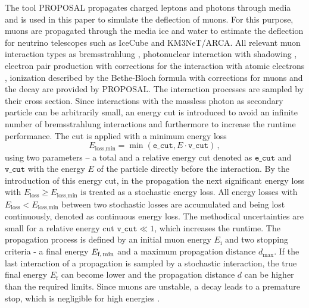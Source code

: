 \documentclass[pdflatex, sn-mathphys]{sn-jnl}%
\theoremstyle{thmstyleone}%
\theoremstyle{thmstyletwo}%
\theoremstyle{thmstylethree}%
\begin{document}
The tool PROPOSAL \cite{koehne2013proposal, dunsch_2018_proposal_improvements} propagates charged leptons and photons through media and is 
used in this paper to simulate the deflection of muons. For this purpose, 
muons are propagated through the media ice and water 
to estimate the deflection for neutrino telescopes such as IceCube and KM3NeT/ARCA. All relevant muon interaction types 
as bremsstrahlung \cite{KKP_1995, Bremsstrahlung_KKP}, photonuclear interaction \cite{Abramowicz_1997} with 
shadowing \cite{ButkevichMikheyev_2002}, electron pair production \cite{epair_kokoulin_petrukhin} with corrections for the 
interaction with atomic electrons \cite{epair_kelner}, 
ionization described by the Bethe-Bloch formula with corrections for muons \cite{Rossi} 
and the decay are provided by PROPOSAL. The interaction processes are sampled by their cross section.
Since interactions 
with the massless photon as secondary particle can be arbitrarily small, an energy cut is introduced to avoid an infinite number of bremsstrahlung interactions 
and furthermore to increase the runtime performance. 
The cut is applied with a minimum energy loss
\begin{equation}
    E_{\text{loss,min}} = \min{(\texttt{e\_cut}, E \cdot \texttt{v\_cut})}\,,
\end{equation}
using two parameters -- a total and a relative energy cut denoted as 
$\texttt{e\_cut}$ and $\texttt{v\_cut}$ with the energy $E$ of the particle 
directly before the interaction. 
By the introduction of 
this energy cut, in the propagation the next significant energy loss with 
$E_{\mathrm{loss}} \geq E_{\text{loss,min}}$ 
is treated as a stochastic energy loss. 
All energy losses with $E_{\mathrm{loss}} < E_{\text{loss,min}}$ between 
two stochastic losses are accumulated and being lost continuously, denoted 
as continuous energy loss.
The methodical uncertainties are small 
for a relative energy cut $\texttt{v\_cut}\ll 1$, which increases the runtime.
The 
propagation process is defined by an initial muon energy $E_{\text{i}}$ and 
two stopping criteria - a final energy $E_{\text{f,\,min}}$ and a 
maximum propagation distance $d_{\text{max}}$. If the last interaction of 
a propagation is sampled by a stochastic interaction, the true final energy 
$E_{\text{f}}$ can become lower and the 
propagation distance $d$ can be higher than the required limits. 
Since muons are unstable, a decay leads to a premature 
stop, which is negligible for high energies \cite{phd_soedingrekso}.
\end{document}
